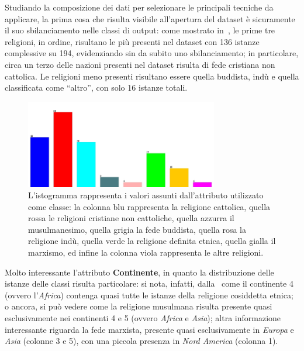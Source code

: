 \documentclass[a4paper,11pt,twoside,notitlepage,final]{scrartcl}
\begin{document}
Studiando la composizione dei dati per selezionare le principali tecniche da applicare,
la prima cosa che risulta visibile all'apertura del dataset è sicuramente il suo sbilanciamento nelle classi di output:
come mostrato in~, le prime tre religioni, in ordine, risultano le più
presenti nel dataset con 136 istanze complessive su 194, evidenziando sin da subito uno sbilanciamento;
in particolare, circa un terzo delle nazioni presenti nel dataset risulta di fede cristiana non cattolica.
Le religioni meno presenti risultano essere quella buddista, indù e quella classificata come ``altro'', con solo
16 istanze totali.

\begin{figure}[H]
  \centering
  \includegraphics[width=0.75\textwidth]{fig/religion-religion.jpg}%
  \caption{%
    L'istogramma rappresenta i valori assunti dall'attributo utilizzato come classe:
    la colonna blu rappresenta la religione cattolica,
    quella rossa le religioni cristiane non cattoliche, quella azzurra il musulmanesimo,
    quella grigia la fede buddista, quella rosa la religione indù, quella verde la religione
    definita etnica, quella gialla il marxismo, ed infine la colonna viola rappresenta le altre religioni.
  }%
  \label{fig:classes}
\end{figure}

Molto interessante l'attributo \textbf{Continente}, in quanto la distribuzione delle istanze delle classi risulta particolare:
si nota, infatti, dalla~ come il continente 4 (ovvero l'\emph{Africa}) contenga quasi tutte le istanze della religione cosiddetta etnica;
o ancora, si può vedere come la religione musulmana risulta presente quasi esclusivamente nei continenti 4 e 5 (ovvero \emph{Africa} e \emph{Asia});
altra informazione interessante riguarda la fede marxista, presente quasi esclusivamente in \emph{Europa} e \emph{Asia} (colonne 3 e 5), con una piccola presenza in \emph{Nord America} (colonna 1).
\end{document}
